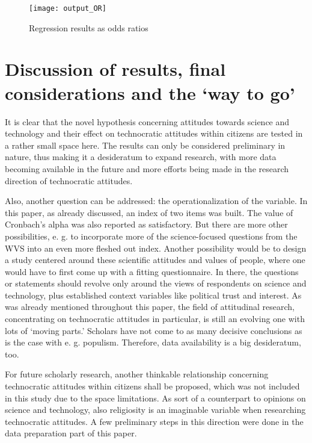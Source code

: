 \documentclass[
  12pt,
  english,
]{article}
\begin{document}
\begin{figure}

{\centering \texttt{[image: output\_OR]} 

}

\caption{Regression results as odds ratios}\label{fig:insert graphics: OR table}
\end{figure}

\newpage{}

\hypertarget{discussion-of-results-final-considerations-and-the-way-to-go}{%
\section{Discussion of results, final considerations and the `way to
go'}\label{discussion-of-results-final-considerations-and-the-way-to-go}}

It is clear that the novel hypothesis concerning attitudes towards
science and technology and their effect on technocratic attitudes within
citizens are tested in a rather small space here. The results can only
be considered preliminary in nature, thus making it a desideratum to
expand research, with more data becoming available in the future and
more efforts being made in the research direction of technocratic
attitudes.

Also, another question can be addressed: the operationalization of the
variable. In this paper, as already discussed, an index of two items was
built. The value of Cronbach's alpha was also reported as satisfactory.
But there are more other possibilities, e. g. to incorporate more of the
science-focused questions from the WVS into an even more fleshed out
index. Another possibility would be to design a study centered around
these scientific attitudes and values of people, where one would have to
first come up with a fitting questionnaire. In there, the questions or
statements should revolve only around the views of respondents on
science and technology, plus established context variables like
political trust and interest. As was already mentioned throughout this
paper, the field of attitudinal research, concentrating on technocratic
attitudes in particular, is still an evolving one with lots of `moving
parts.' Scholars have not come to as many decisive conclusions as is the
case with e. g. populism. Therefore, data availability is a big
desideratum, too.

For future scholarly research, another thinkable relationship concerning
technocratic attitudes within citizens shall be proposed, which was not
included in this study due to the space limitations. As sort of a
counterpart to opinions on science and technology, also religiosity is
an imaginable variable when researching technocratic attitudes. A few
preliminary steps in this direction were done in the data preparation
part of this paper.
\end{document}
